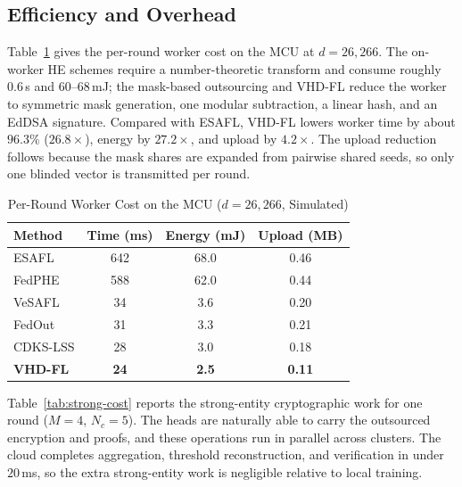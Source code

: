 \subsection{Efficiency and Overhead}
\label{subsec:efficiency}
Table~\ref{tab:worker-cost} gives the per-round worker cost on the MCU at $d=26{,}266$. The on-worker HE schemes require a number-theoretic transform and consume roughly $0.6$\,s and $60$--$68$\,mJ; the mask-based outsourcing and \textsc{VHD-FL} reduce the worker to symmetric mask generation, one modular subtraction, a linear hash, and an EdDSA signature. Compared with ESAFL, \textsc{VHD-FL} lowers worker time by about $96.3\%$ ($26.8\times$), energy by $27.2\times$, and upload by $4.2\times$. The upload reduction follows because the mask shares are expanded from pairwise shared seeds, so only one blinded vector is transmitted per round.

\begin{table}[t]
\centering
\caption{Per-Round Worker Cost on the MCU ($d=26{,}266$, Simulated)}
\label{tab:worker-cost}
\footnotesize
\setlength{\tabcolsep}{3.5pt}
\renewcommand{\arraystretch}{1.15}
\begin{tabular}{@{}lccc@{}}
\toprule
Method & Time (ms) & Energy (mJ) & Upload (MB) \\
\midrule
ESAFL    & 642 & 68.0 & 0.46 \\
FedPHE   & 588 & 62.0 & 0.44 \\
VeSAFL   & 34  & 3.6  & 0.20 \\
FedOut   & 31  & 3.3  & 0.21 \\
CDKS-LSS & 28  & 3.0  & 0.18 \\
\textbf{VHD-FL} & \textbf{24} & \textbf{2.5} & \textbf{0.11} \\
\bottomrule
\end{tabular}
\end{table}

Table~\ref{tab:strong-cost} reports the strong-entity cryptographic work for one round ($M=4$, $N_c=5$). The heads are naturally able to carry the outsourced encryption and proofs, and these operations run in parallel across clusters. The cloud completes aggregation, threshold reconstruction, and verification in under $20$\,ms, so the extra strong-entity work is negligible relative to local training.

